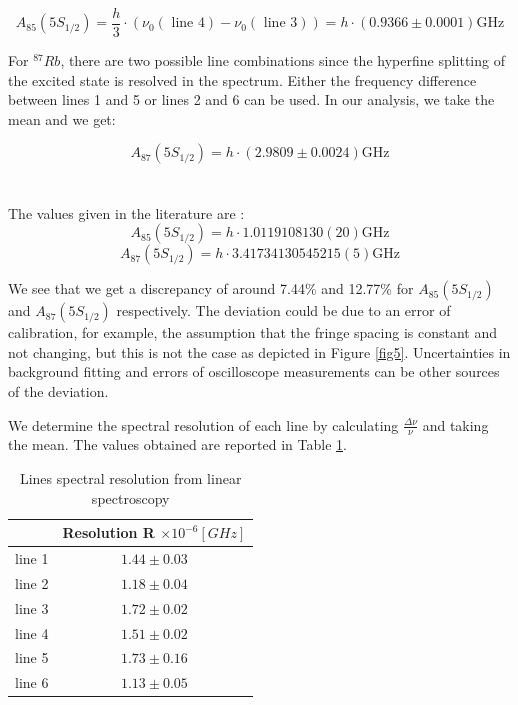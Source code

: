 \documentclass[12pt]{article}
\begin{document}
\begin{equation*}
A_{85}\left(5 S_{1 / 2}\right)=\frac{h}{3} \cdot\left(\nu_0(\text { line } 4)-\nu_0(\text { line } 3)\right)=h \cdot(0.9366 \pm 0.0001) \mathrm{GHz}
\end{equation*}


For $^{87}Rb$, there are two possible line combinations since the hyperfine splitting of the excited state is resolved in the spectrum. Either the frequency difference between lines 1 and 5 or lines 2 and 6 can be used. In our analysis, we take the mean and we get:

\begin{equation*}
A_{87}\left(5 S_{1 / 2}\right)=h \cdot(2.9809 \pm 0.0024) \mathrm{GHz}
\end{equation*}
\\ \\ 
The values given in the literature are \cite{Rb85}\cite{Rb87}:
\begin{equation*}
A_{85}\left(5 S_{1 / 2}\right)=h \cdot 1.011 910 813 0(20) \mathrm{GHz}
\end{equation*}
\begin{equation*}
A_{87}\left(5 S_{1 / 2}\right)=h \cdot3.417 341 305 452 15(5) \mathrm{GHz}
\end{equation*}

We see that we get a discrepancy of around 7.44\% and 12.77\% for $A_{85}(5 S_{1 / 2})$ and $A_{87}(5 S_{1 / 2})$ respectively. 
The deviation could be due to an error of calibration, for example, the assumption that the fringe spacing is constant and not changing, but this is not the case as depicted in Figure \ref{fig5}. Uncertainties in background fitting and errors of oscilloscope measurements can be other sources of the deviation. 

We determine the spectral resolution of each line by calculating $\frac{\Delta\nu}{\nu}$ and taking the mean. The values obtained are reported in Table \ref{tab4}.



\begin{table}[H] \centering  \begin{tabular}{c|c} 
\hline
\hline 
& Resolution R  $ \times 10^{-6} [GHz]$ \\
\hline 
line 1 & $1.44 \pm 0.03$ \\
line 2 & $1.18 \pm 0.04$ \\
line 3 & $1.72 \pm 0.02$ \\
line 4 & $1.51 \pm 0.02$ \\
line 5 & $1.73 \pm 0.16$ \\
line 6 & $1.13 \pm 0.05$ \\
\hline 
\end{tabular}
\caption{Lines spectral resolution from linear spectroscopy}
\label{tab4} 
\end{table}
\end{document}
